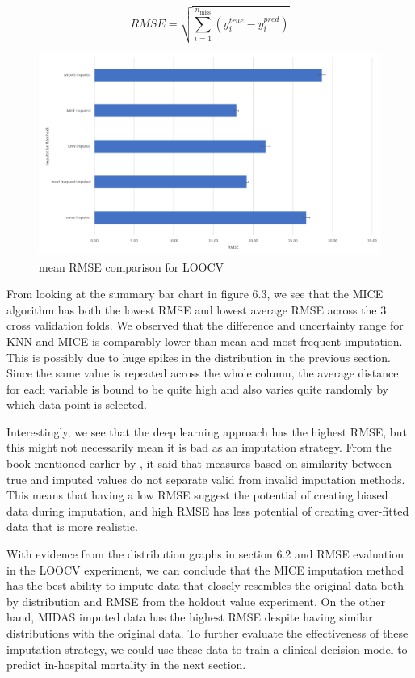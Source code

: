 \documentclass{l4proj}
\begin{document}
\begin{equation} \label{eq:1}
RMSE = \sqrt{\sum_{i=1}^{n_\text{miss}}(y_i^{true}-y_i^{pred})}
\end{equation}


\begin{figure}[!htb]
  \caption{mean RMSE comparison for LOOCV}
  \includegraphics[width=\textwidth]{dissertation/Latex/images/holdout_rmse.PNG}
\end{figure}


From looking at the summary bar chart in figure 6.3, we see that the MICE algorithm has both the lowest RMSE and lowest average RMSE across the 3 cross validation folds. We observed that the difference and uncertainty range for KNN and MICE is comparably lower than mean and most-frequent imputation. This is possibly due to huge spikes in the distribution in the previous section. Since the same value is repeated across the whole column, the average distance for each variable is bound to be quite high and also varies quite randomly by which data-point is selected.

Interestingly, we see that the deep learning approach has the highest RMSE, but this might not necessarily mean it is bad as an imputation strategy. From the book mentioned earlier by \cite{buuren_2021}, it said that measures based on similarity between true and imputed values do not separate valid from invalid imputation methods. This means that having a low RMSE suggest the potential of creating biased data during imputation, and high RMSE has less potential of creating over-fitted data that is more realistic. 

With evidence from the distribution graphs in section 6.2 and RMSE evaluation in the LOOCV experiment, we can conclude that the MICE imputation method has the best ability to impute data that closely resembles the original data both by distribution and RMSE from the holdout value experiment. On the other hand, MIDAS imputed data has the highest RMSE despite having similar distributions with the original data. To further evaluate the effectiveness of these imputation strategy, we could use these data to train a clinical decision model to predict in-hospital mortality in the next section.
\end{document}
